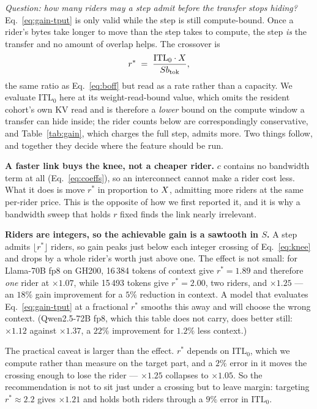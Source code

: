 \emph{Question: how many riders may a step admit before the transfer stops hiding?}
Eq.~\ref{eq:gain-tput} is only valid while the step is still compute-bound. Once a
rider's bytes take longer to move than the step takes to compute, the step
\emph{is} the transfer and no amount of overlap helps. The crossover is
%
\begin{equation}
\label{eq:knee}
r^{*} \;=\; \frac{\mathrm{ITL}_0 \cdot X}{S b_{\mathrm{tok}}},
\end{equation}
%
the same ratio as Eq.~\ref{eq:boff} but read as a rate rather than a capacity. We
evaluate $\mathrm{ITL}_0$ here at its weight-read-bound value, which omits the
resident cohort's own KV read and is therefore a \emph{lower} bound on the compute
window a transfer can hide inside; the rider counts below are correspondingly
conservative, and Table~\ref{tab:gain}, which charges the full step, admits more.
Two things follow, and together they decide where the feature should be run.

\textbf{A faster link buys the knee, not a cheaper rider.} $c$ contains no
bandwidth term at all (Eq.~\ref{eq:coeffs}), so an interconnect cannot make a
rider cost less. What it does is move $r^{*}$ in proportion to $X$, admitting
more riders at the same per-rider price. This is the opposite of how we first
reported it, and it is why a bandwidth sweep that holds $r$ fixed finds the link
nearly irrelevant.

\textbf{Riders are integers, so the achievable gain is a sawtooth in $S$.} A step
admits $\lfloor r^{*} \rfloor$ riders, so gain peaks just below each integer
crossing of Eq.~\ref{eq:knee} and drops by a whole rider's worth just above one.
The effect is not small: for Llama-70B fp8 on GH200, 16\,384 tokens of context give
$r^{*} = 1.89$ and therefore \emph{one} rider at $\times 1.07$, while 15\,493
tokens give $r^{*} = 2.00$, two riders, and $\times 1.25$ --- an $18\%$ gain
improvement for a $5\%$ reduction in context. A model that evaluates
Eq.~\ref{eq:gain-tput} at a fractional $r^{*}$ smooths this away and will choose
the wrong context. (Qwen2.5-72B fp8, which this table does not carry, does better
still: $\times 1.12$ against $\times 1.37$, a $22\%$ improvement for $1.2\%$ less
context.)

The practical caveat is larger than the effect. $r^{*}$ depends on
$\mathrm{ITL}_0$, which we compute rather than measure on the target part, and a
$2\%$ error in it moves the crossing enough to lose the rider --- $\times 1.25$
collapses to $\times 1.05$. So the recommendation is not to sit just under a
crossing but to leave margin: targeting $r^{*} \approx 2.2$ gives $\times 1.21$ and
holds both riders through a $9\%$ error in $\mathrm{ITL}_0$.

